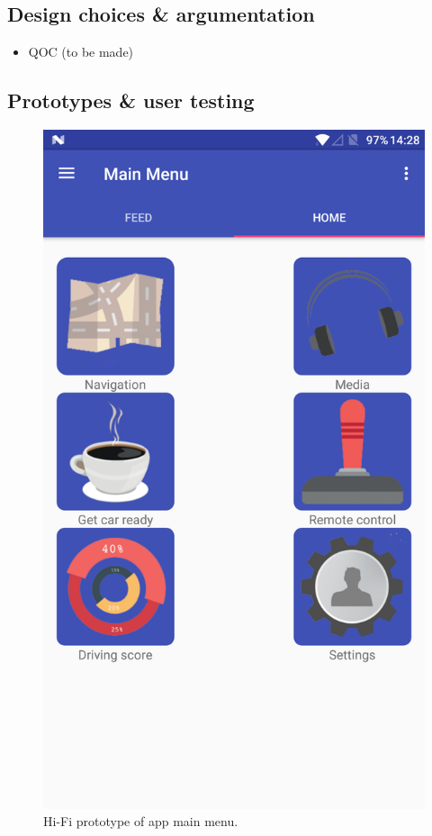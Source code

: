 \documentclass{article}
\begin{document}
\subsection{Design choices \& argumentation}
  \begin{itemize}
    \item QOC (to be made)
  \end{itemize}
\subsection{Prototypes \& user testing}
  \begin{figure}[H]
    \centering
    \includegraphics[scale=0.25]{main-menu}
    \caption{Hi-Fi prototype of app main menu.}
    \label{main-menu}
  \end{figure}
\end{document}
